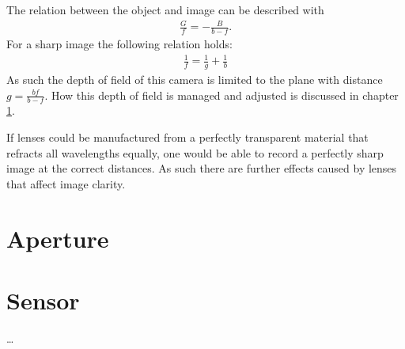 The relation between the object and image can be described with
\begin{align}
    \frac{G}{f} = - \frac{B}{b-f}.
\end{align}
For a sharp image the following relation holds:
\begin{align}
    \frac{1}{f} = \frac{1}{g} + \frac{1}{b}
\end{align}
As such the depth of field of this camera is limited to the plane with distance $g = \frac{bf}{b-f}$.
How this depth of field is managed and adjusted is discussed in chapter \ref{ch:background-aperture}.

If lenses could be manufactured from a perfectly transparent material that refracts all wavelengths equally, one would be able to record a perfectly sharp image at the correct distances.
As such there are further effects caused by lenses that affect image clarity.



\section{Aperture}
\label{ch:background-aperture}



\section{Sensor}
\dots